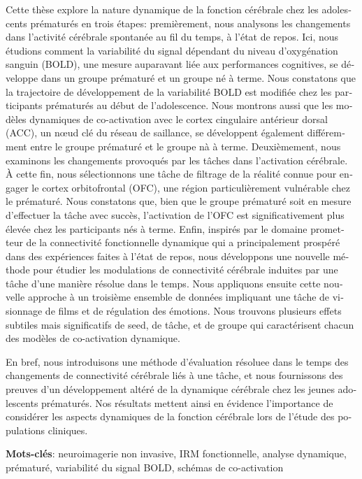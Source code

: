 \begin{otherlanguage}{french}
\hspace{1cm}Cette thèse explore la nature dynamique de la fonction cérébrale chez les adolescents prématurés en trois étapes: premièrement, nous analysons les changements dans l'activité cérébrale spontanée au fil du temps, à l'état de repos. Ici, nous étudions comment la variabilité du signal dépendant du niveau d'oxygénation sanguin (BOLD), une mesure auparavant liée aux performances cognitives, se développe dans un groupe prématuré et un groupe né à terme. Nous constatons que la trajectoire de développement de la variabilité BOLD est modifiée chez les participants prématurés au début de l'adolescence. Nous montrons aussi que les modèles dynamiques de co-activation avec le cortex cingulaire antérieur dorsal (ACC), un nœud clé du réseau de saillance, se développent également différemment entre le groupe prématuré et le groupe nà à terme. Deuxièmement, nous examinons les changements provoqués par les tâches dans l'activation cérébrale. À cette fin, nous sélectionnons une tâche de filtrage de la réalité connue pour engager le cortex orbitofrontal (OFC), une région particulièrement vulnérable chez le prématuré. Nous constatons que, bien que le groupe prématuré soit en mesure d'effectuer la tâche avec succès, l'activation de l'OFC est significativement plus élevée chez les participants nés à terme. Enfin, inspirés par le domaine prometteur de la connectivité fonctionnelle dynamique qui a principalement prospéré dans des expériences faites à l'état de repos, nous développons une nouvelle méthode pour étudier les modulations de connectivité cérébrale induites par une tâche d'une manière résolue dans le temps. Nous appliquons ensuite cette nouvelle approche à un troisième ensemble de données impliquant une tâche de visionnage de films et de régulation des émotions. Nous trouvons plusieurs effets subtiles mais significatifs de seed, de tâche, et de groupe qui caractérisent chacun des modèles de co-activation dynamique.

\hspace{1cm}En bref, nous introduisons une méthode d'évaluation résoluee dans le temps des changements de connectivité cérébrale liés à une tâche, et nous fournissons des preuves d'un développement altéré de la dynamique cérébrale chez les jeunes adolescents prématurés. Nos résultats mettent ainsi en évidence l'importance de considérer les aspects dynamiques de la fonction cérébrale lors de l'étude des populations cliniques.


\vspace{0.5cm}
\textbf{Mots-clés}: neuroimagerie non invasive, IRM fonctionnelle, analyse dynamique, prématuré, variabilité du signal BOLD, schémas de co-activation



\end{otherlanguage}


